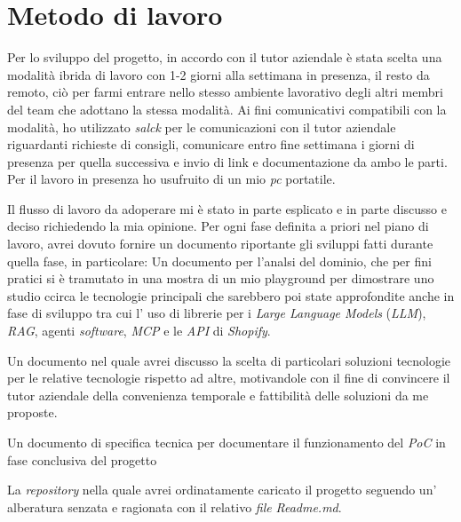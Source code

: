 \section{Metodo di lavoro}

Per lo sviluppo del progetto, in accordo con il tutor aziendale è stata scelta una modalità ibrida di lavoro con  1-2 giorni alla settimana in presenza, il resto da remoto,
ciò per farmi entrare nello stesso ambiente lavorativo degli altri membri del team che adottano la stessa modalità.
Ai fini comunicativi compatibili con la modalità, ho utilizzato \emph{salck} per le comunicazioni con il tutor aziendale riguardanti richieste di consigli, comunicare entro fine settimana i giorni di presenza per quella successiva
e invio di link e documentazione da ambo le parti.
Per il lavoro in presenza ho usufruito di un mio \emph{pc} portatile.

Il flusso di lavoro da adoperare mi è stato in parte esplicato e in parte discusso e deciso richiedendo la mia opinione.
Per ogni fase definita a priori nel piano di lavoro, avrei dovuto fornire un documento riportante gli sviluppi fatti durante quella fase, 
in particolare:
Un documento per l'analsi del dominio, che per fini pratici si è tramutato in una mostra di un mio playground per dimostrare uno studio ccirca le tecnologie
principali che sarebbero poi state approfondite anche in fase di sviluppo tra cui l' uso di librerie per i \emph{Large Language Models} (\emph{LLM}), 
\emph{RAG}, agenti \emph{software}, \emph{MCP} e le \emph{API} di \emph{Shopify}.

Un documento nel quale avrei discusso la scelta di particolari soluzioni tecnologie per le relative tecnologie rispetto ad altre, motivandole con il fine di convincere
il tutor aziendale della convenienza temporale e fattibilità delle soluzioni da me proposte.

Un documento di specifica tecnica per documentare il funzionamento del \emph{PoC} in fase conclusiva del progetto

La \emph{repository} nella quale avrei ordinatamente caricato il progetto seguendo un' alberatura senzata e ragionata con il relativo \emph{file} \emph{Readme.md}. 




